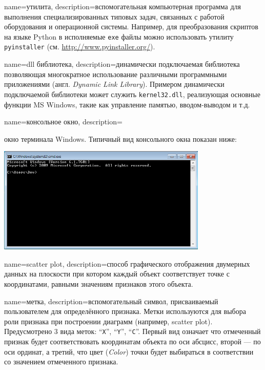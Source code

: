 {
	name=утилита,
	description={вспомогательная компьютерная программа для выполнения специализированных типовых задач, связанных с работой оборудования и операционной системы. Например, для преобразования скриптов на языке Python в исполняемые \texttt{exe} файлы можно использовать утилиту \texttt{pyinstaller} (см. \url{http://www.pyinstaller.org/}).}
}

{
	name=dll библиотека,
	description={динамически подключаемая библиотека позволяющая многократное использование различными программными приложениями (англ. \textit{Dynamic Link Library}). Примером динамически подключаемой библиотеки может служить \texttt{kernel32.dll}, реализующая основные функции MS Windows, такие как управление памятью, вводом-выводом и т.д.}
}

{
	name=консольное окно,
	description={окно терминала Windows. Типичный вид консольного окна показан ниже:
	\newline\begin{center}
		\includegraphics[width=0.75\textwidth]{img/terminalexample}
	\end{center}}
}

{
	name=scatter plot,
	description={способ графического отображения двумерных данных на плоскости при котором каждый объект соответствует точке с координатами, равными значениям признаков этого объекта.}
}

{
	name=метка,
	description={вспомогательный символ, присваиваемый пользователем для  определённого признака. Метки используются для выбора роли признака при построении диаграмм (например, scatter plot). Предусмотрено 3 вида меток: ``\texttt{X}'', ``\texttt{Y}'', ``\texttt{C}''. Первый вид означает что отмеченный признак будет соответствовать координатам объекта по оси абсцисс, второй --- по оси ординат, а третий, что цвет (\textit{Color}) точки будет выбираться в соответствии со значением отмеченного признака.}
}

